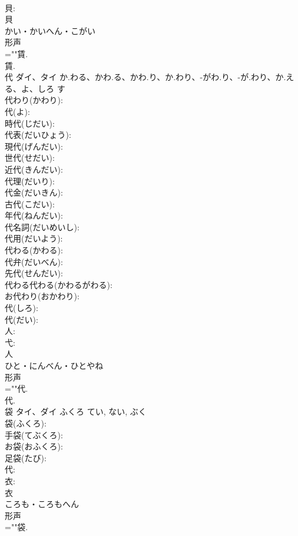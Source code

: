 \documentclass[8pt]{extreport}
\begin{document}
\begin{CJK}{UTF8}{min}
\\	貝: 
\\	貝	
\\	かい・かいへん・こがい	
\\	形声 
\\	=""賃.
\\	賃.
\\	代	ダイ、タイ	か.わる、かわ.る、かわ.り、か.わり、-がわ.り、-が.わり、か.える、よ、しろ	す	
\\	代わり(かわり): 
\\	代(よ): 
\\	時代(じだい): 
\\	代表(だいひょう): 
\\	現代(げんだい): 
\\	世代(せだい): 
\\	近代(きんだい): 
\\	代理(だいり): 
\\	代金(だいきん): 
\\	古代(こだい): 
\\	年代(ねんだい): 
\\	代名詞(だいめいし): 
\\	代用(だいよう): 
\\	代わる(かわる): 
\\	代弁(だいべん): 
\\	先代(せんだい): 
\\	代わる代わる(かわるがわる): 
\\	お代わり(おかわり): 
\\	代(しろ): 
\\	代(だい): 
\\	人: 
\\	弋: 
\\	人	
\\	ひと・にんべん・ひとやね	
\\	形声 
\\	=""代.
\\	代.
\\	袋	タイ、ダイ	ふくろ	てい, ない, ぶく	
\\	袋(ふくろ): 
\\	手袋(てぶくろ): 
\\	お袋(おふくろ): 
\\	足袋(たび): 
\\	代: 
\\	衣: 
\\	衣	
\\	ころも・ころもへん	
\\	形声 
\\	=""袋.

\end{CJK}
\end{document}
